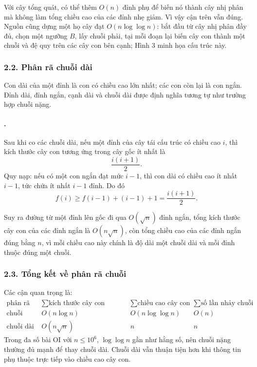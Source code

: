 \documentclass[11pt]{article}
\begin{document}
Với cây tổng quát, có thể thêm \(O(n)\) đỉnh phụ để biến nó thành cây nhị phân
mà không làm tổng chiều cao của các đỉnh nhẹ giảm. Vì vậy cận trên vẫn đúng.
Nguồn cũng dựng một họ cây đạt \(O(n\log\log n)\): bắt đầu từ cây nhị phân đầy
đủ, chọn một ngưỡng \(B\), lấy chuỗi phải, tại mỗi đoạn lại biến cây con thành
một chuỗi và đệ quy trên các cây con bên cạnh; Hình 3 minh họa cấu trúc này.

\begin{center}
\end{center}

\subsubsection*{2.2. Phân rã chuỗi dài}

Con dài của một đỉnh là con có chiều cao lớn nhất; các con còn lại là con
ngắn. Đỉnh dài, đỉnh ngắn, cạnh dài và chuỗi dài được định nghĩa tương tự như
trường hợp chuỗi nặng.

\paragraph{.}
Sau khi co các chuỗi dài, nếu một đỉnh của cây tái cấu trúc có chiều cao \(i\),
thì kích thước cây con tương ứng trong cây gốc ít nhất là
\[
  \frac{i(i+1)}{2}.
\]
Quy nạp: nếu có một con ngắn đạt mức \(i-1\), thì con dài có chiều cao ít nhất
\(i-1\), tức chứa ít nhất \(i-1\) đỉnh. Do đó
\[
  f(i)\ge f(i-1)+(i-1)+1=\frac{i(i+1)}2.
\]

Suy ra đường từ một đỉnh lên gốc đi qua \(O(\sqrt n)\) đỉnh ngắn, tổng kích
thước cây con của các đỉnh ngắn là \(O(n\sqrt n)\), còn tổng chiều cao của các
đỉnh ngắn đúng bằng \(n\), vì mỗi chiều cao này chính là độ dài một chuỗi dài
và mỗi đỉnh thuộc đúng một chuỗi.

\subsubsection*{2.3. Tổng kết về phân rã chuỗi}

Các cận quan trọng là:
\[
\begin{array}{c|c|c|c}
\text{phân rã} & \sum\text{kích thước cây con nhẹ/ngắn}
& \sum\text{chiều cao cây con} & \sum\text{số lần nhảy chuỗi}\\
\hline
\text{chuỗi nặng} & O(n\log n) & O(n\log\log n) & O(n)\\
\text{chuỗi dài} & O(n\sqrt n) & n & n
\end{array}
\]
Trong đa số bài OI với \(n\le 10^6\), \(\log\log n\) gần như hằng số, nên
chuỗi nặng thường đủ mạnh để thay chuỗi dài. Chuỗi dài vẫn thuận tiện hơn khi
thông tin phụ thuộc trực tiếp vào chiều cao cây con.
\end{document}
